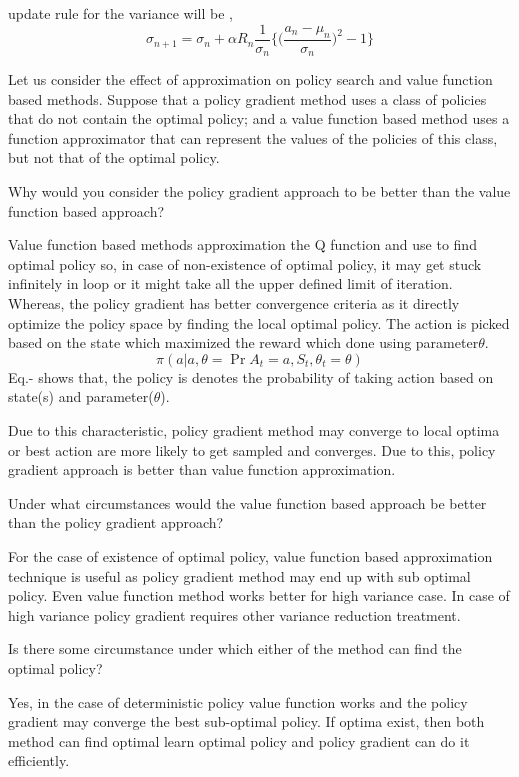 \documentclass[solution,addpoints,12pt]{exam}
\begin{document}
\begin{questions}
\begin{solution}
update rule for the variance will be ,
\begin{equation}
\sigma_{n+1} = \sigma_{n} + \alpha R_n \frac{1}{\sigma_n} \bigg\{ \bigg(\frac{a_n -\mu_n}{\sigma_n}\bigg)^2 - 1 \bigg\}
\end{equation}


\end{solution}
\question[6]
 Let us consider the effect of approximation on policy search and value function based methods. Suppose that a policy gradient method uses a class of policies that do not contain the optimal policy; and a value function based method uses a function approximator that can represent the values of the policies of this class, but not that of the optimal policy.
 \begin{enumerate}[label=(\alph*)]
     \question[2]  Why would you consider the policy gradient approach to be better than the value function based approach?
     \begin{solution}
		Value function based methods approximation the Q function and use to find optimal policy so, in case of non-existence of optimal policy, it may get stuck infinitely in loop or it might take all the upper defined limit of iteration. Whereas, the policy gradient has better convergence criteria as it directly optimize the policy space by finding the local optimal policy. The action is picked based on the state which maximized the reward which done using parameter$\theta$.
		\begin{equation}
			\pi(a|a,\theta = \Pr{A_t=a,S_t,\theta_t=\theta})
		\end{equation}
		Eq.- shows that, the policy is denotes the probability of taking action based on state(s) and parameter($\theta$).
		
		 Due to this characteristic, policy gradient method may converge to local optima or best action are more likely to get sampled and converges. Due to this, policy gradient approach is better than value function approximation. 
     
     \end{solution}
     \question[2]  Under what circumstances would the value function based approach be better than the policy gradient approach?
     \begin{solution}
     For the case of existence of optimal policy, value function based approximation technique is useful as policy gradient method may end up with sub optimal policy.  Even value function method works better for high variance case. In case of high variance policy gradient requires other variance reduction treatment.
     \end{solution}
     \question[2]  Is there some circumstance under which either of the method can find the optimal policy?
     \begin{solution}
     	Yes, in the case of deterministic policy value function works and the policy gradient may converge the best sub-optimal policy. If optima exist, then both method can find optimal learn optimal policy and policy gradient can do it efficiently.  
     \end{solution}
 

\end{enumerate}
\end{questions}
\end{document}
